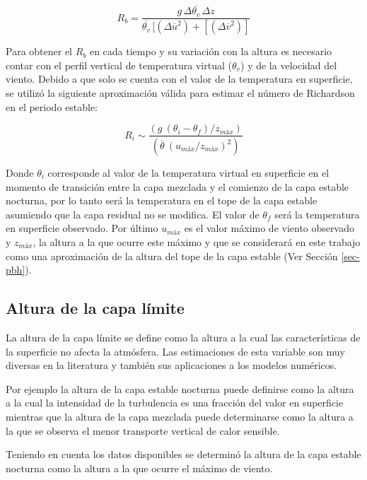 \documentclass[12pt,spanish,oneside, a4paper]{book}
\begin{document}
\begin{equation} \label{eq-ri2}
R_b = \frac{g \, \Delta \overline{\theta_v} \, \Delta z}{\overline{\theta_v} \, [(\Delta \overline{u}^2) + [(\Delta \overline{v}^2)]}
\end{equation}

Para obtener el \(R_b\) en cada tiempo y su variación con la altura es
necesario contar con el perfil vertical de temperatura virtual
(\(\theta_v\)) y de la velocidad del viento. Debido a que solo se cuenta
con el valor de la temperatura en superficie, se utilizó la siguiente
aproximación válida para estimar el número de Richardson en el periodo
estable:

\begin{equation} \label{eq-ri3}
R_i \sim \frac{(g  \: (\theta_i - \theta_f)/z_{máx})}{(\overline{\theta} \: (u_{máx}/z_{máx})^2)}
\end{equation}

Donde \(\theta_i\) corresponde al valor de la temperatura virtual en
superficie en el momento de transición entre la capa mezclada y el
comienzo de la capa estable nocturna, por lo tanto será la temperatura
en el tope de la capa estable asumiendo que la capa residual no se
modifica. El valor de \(\theta_f\) será la temperatura en superficie
observado. Por último \(u_{máx}\) es el valor máximo de viento observado
y \(z_{máx}\), la altura a la que ocurre este máximo y que se
considerará en este trabajo como una aproximación de la altura del tope
de la capa estable (Ver Sección \ref{sec-pbh}).

\subsection{\texorpdfstring{Altura de la capa límite
\label{sec-pbh}}{Altura de la capa límite }}\label{altura-de-la-capa-limite}

La altura de la capa límite se define como la altura a la cual las
características de la superficie no afecta la atmósfera. Las
estimaciones de esta variable son muy diversas en la literatura y
también sus aplicaciones a los modelos numéricos.

Por ejemplo la altura de la capa estable nocturna puede definirse como
la altura a la cual la intensidad de la turbulencia es una fracción del
valor en superficie mientras que la altura de la capa mezclada puede
determinarse como la altura a la que se observa el menor transporte
vertical de calor sensible.

Teniendo en cuenta los datos disponibles se determinó la altura de la
capa estable nocturna como la altura a la que ocurre el máximo de
viento.
\end{document}
